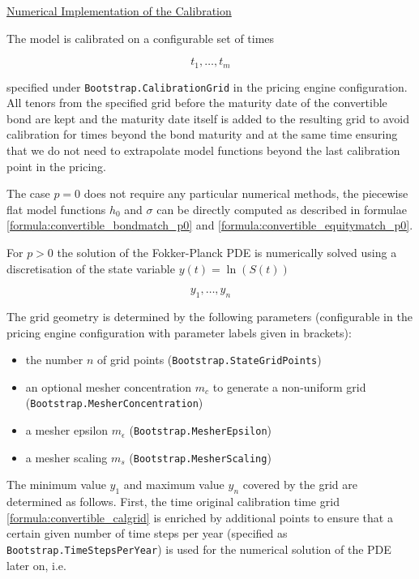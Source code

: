 \underline{Numerical Implementation of the Calibration}

The model is calibrated on a configurable set of times

\begin{equation}\label{formula:convertible_calgrid}
t_1,\ldots,t_m
\end{equation}

specified under \verb+Bootstrap.CalibrationGrid+ in the pricing engine configuration. All tenors from the specified grid
before the maturity date of the convertible bond are kept and the maturity date itself is added to the resulting grid to
avoid calibration for times beyond the bond maturity and at the same time ensuring that we do not need to extrapolate
model functions beyond the last calibration point in the pricing.

The case $p=0$ does not require any particular numerical methods, the piecewise flat model functions $h_0$ and $\sigma$
can be directly computed as described in formulae \ref{formula:convertible_bondmatch_p0} and
\ref{formula:convertible_equitymatch_p0}.

For $p>0$ the solution of the Fokker-Planck PDE is numerically solved using a discretisation of the state variable
$y(t)=\ln(S(t))$

\begin{equation}
  y_1, \ldots, y_n
\end{equation}

The grid geometry is determined by the following parameters (configurable in the pricing engine configuration with
parameter labels given in brackets):

\begin{itemize}
\item the number $n$ of grid points (\verb+Bootstrap.StateGridPoints+)
\item an optional mesher concentration $m_c$ to generate a non-uniform grid \\ (\verb+Bootstrap.MesherConcentration+)
\item a mesher epsilon $m_\epsilon$ (\verb+Bootstrap.MesherEpsilon+)
\item a mesher scaling $m_s$ (\verb+Bootstrap.MesherScaling+)
\end{itemize}

The minimum value $y_1$ and maximum value $y_n$ covered by the grid are determined as follows. First, the time original
calibration time grid \ref{formula:convertible_calgrid} is enriched by additional points to ensure that a certain given
number of time steps per year (specified as \verb+Bootstrap.TimeStepsPerYear+) is used for the numerical solution of the
PDE later on, i.e.

